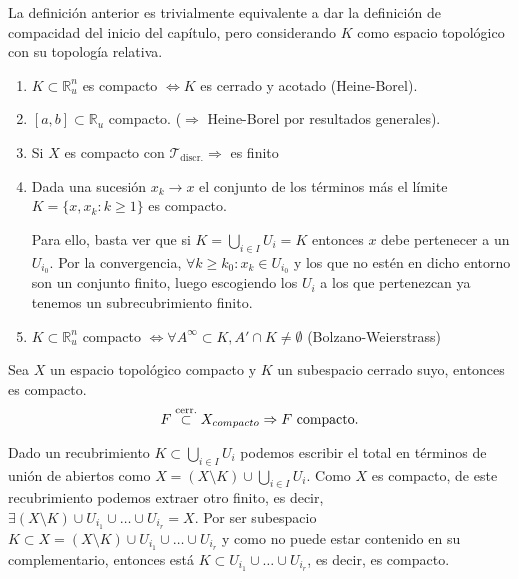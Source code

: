 \begin{obs}
La definición anterior es trivialmente equivalente a dar la definición de compacidad del inicio del capítulo, pero considerando $K$ como espacio topológico con su topología relativa.
\end{obs}

\begin{ej}
\begin{enumerate}
    \item $K \subset \mathbb{R}_u^n$ es compacto $\Leftrightarrow K$ es cerrado y acotado (Heine-Borel). 
    \item $\left[ a, b \right] \subset \mathbb{R}_u$ compacto. ($\Rightarrow$ Heine-Borel por resultados generales).
    \item Si $X$ es compacto con $\mathcal{T}_{\text{discr.}} \Rightarrow$ es finito 
    \item Dada una sucesión $x_k \rightarrow x$ el conjunto de los términos más el límite $K = \{x, x_k: k \ge 1\}$ es compacto.
    
   	Para ello, basta ver que si $K = \bigcup_{i \in I} U_i = K$ entonces $x$ debe pertenecer a un $U_{i_0}$. Por la convergencia, $\forall k \geq k_0 : x_k \in U_{i_0}$ y los que no estén en dicho entorno son un conjunto finito, luego escogiendo los $U_i$ a los que pertenezcan ya tenemos un subrecubrimiento finito.

    \item $K \subset \mathbb{R}_u^n$ compacto $\Leftrightarrow \forall A^{\infty} \subset K, A' \cap K \neq \emptyset$ (Bolzano-Weierstrass)
\end{enumerate}
\end{ej}

\begin{prop}[Mantra 1]
Sea $X$ un espacio topológico compacto y $K$ un subespacio cerrado suyo, entonces es compacto.
\[
F \stackrel{\text{cerr.}}{\subset} X _{compacto} \Rightarrow F \text{ compacto.}
\]
\end{prop}
\begin{demo}
Dado un recubrimiento $K \subset \bigcup_{i \in I} U_i$ podemos escribir el total en términos de unión de abiertos como $X = \left( X \setminus K \right) \cup \bigcup_{i \in I} U_i$. Como $X$ es compacto, de este recubrimiento podemos extraer otro finito, es decir, $\exists \left( X \setminus K \right) \cup U_{i_1} \cup \ldots \cup U_{i_r} = X$. Por ser subespacio $K \subset X = \left( X \setminus K \right) \cup U_{i_1} \cup \ldots \cup U_{i_r}$ y como no puede estar contenido en su complementario, entonces está $K\subset U_{i_1} \cup \ldots \cup U_{i_r}$, es decir, es compacto.
\end{demo}

